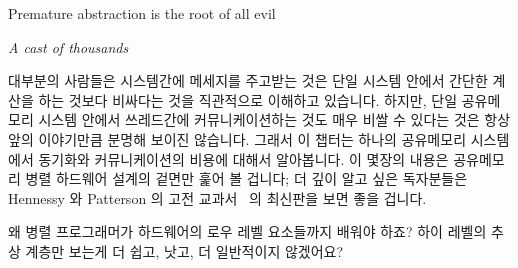 

\epigraph{Premature abstraction is the root of all evil}
	 {\emph{A cast of thousands}}

대부분의 사람들은 시스템간에 메세지를 주고받는 것은 단일 시스템 안에서 간단한
계산을 하는 것보다 비싸다는 것을 직관적으로 이해하고 있습니다.
하지만, 단일 공유메모리 시스템 안에서 쓰레드간에 커뮤니케이션하는 것도 매우
비쌀 수 있다는 것은 항상 앞의 이야기만큼 분명해 보이진 않습니다.
그래서 이 챕터는 하나의 공유메모리 시스템에서 동기화와 커뮤니케이션의 비용에
대해서 알아봅니다.
이 몇장의 내용은 공유메모리 병렬 하드웨어 설계의 겉면만 훑어 볼 겁니다; 더 깊이
알고 싶은 독자분들은 Hennessy 와 Patterson 의 고전 교과서~\cite{Hennessy95a} 의
최신판을 보면 좋을 겁니다.
\iffalse

Most people have an intuitive understanding that passing messages between
systems is considerably more expensive than performing simple calculations
within the confines of a single system.
However, it is not always so clear that communicating among threads within
the confines of a single shared-memory system can also be quite expensive.
This chapter therefore looks at the cost of synchronization and communication
within a shared-memory system.
These few pages can do no more than scratch the surface of shared-memory
parallel hardware design; readers desiring more detail would do well
to start with a recent edition of Hennessy and Patterson's classic
text~\cite{Hennessy2011,Hennessy95a}.
\fi

\QuickQuiz{}
	왜 병렬 프로그래머가 하드웨어의 로우 레벨 요소들까지 배워야 하죠?
	하이 레벨의 추상 계층만 보는게 더 쉽고, 낫고, 더 일반적이지 않겠어요?

